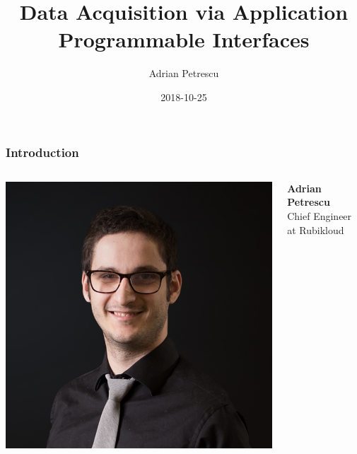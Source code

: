 \documentclass{beamer}
\title[Data Acquisition via APIs]{Data Acquisition via Application Programmable Interfaces}
\author{Adrian Petrescu}
\institute{Rubikloud}
\date{2018-10-25}
\begin{document}
\frame{\titlepage}


\begin{frame}
  \frametitle{Introduction}

  \begin{columns}

    \includegraphics{img/speaker-headshot.png}

    \textbf{Adrian Petrescu} \\
    Chief Engineer at Rubikloud
  \end{columns}
\end{frame}
\end{document}
